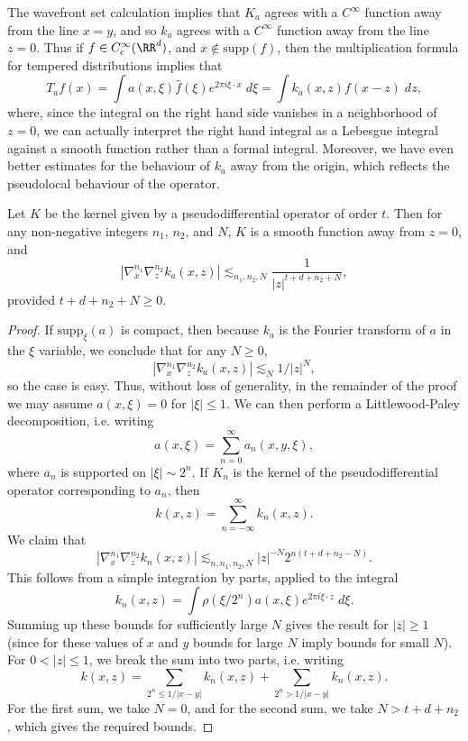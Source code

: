 The wavefront set calculation implies that $K_a$ agrees with a $C^\infty$ function away from the line $x = y$, and so $k_a$ agrees with a $C^\infty$ function away from the line $z = 0$. Thus if $f \in C_c^\infty(\RR^d)$, and $x \not \in \text{supp}(f)$, then the multiplication formula for tempered distributions implies that
%
\[ T_af(x) = \int a(x,\xi) \widehat{f}(\xi) e^{2 \pi i \xi \cdot x}\; d\xi = \int k_a(x,z) f(x-z)\; dz, \]
%
where, since the integral on the right hand side vanishes in a neighborhood of $z = 0$, we can actually interpret the right hand integral as a Lebesgue integral against a smooth function rather than a formal integral. Moreover, we have even better estimates for the behaviour of $k_a$ away from the origin, which reflects the pseudolocal behaviour of the operator.

\begin{theorem}
    Let $K$ be the kernel given by a pseudodifferential operator of order $t$. Then for any non-negative integers $n_1$, $n_2$, and $N$, $K$ is a smooth function away from $z = 0$, and
    \[ |\nabla^{n_1}_x \nabla^{n_2}_z k_a(x,z)| \lesssim_{n_1,n_2,N} \frac{1}{|z|^{t + d + n_2 + N}}, \]
    provided $t + d + n_2 + N \geq 0$.
\end{theorem}
\begin{proof}
    If $\text{supp}_\xi(a)$ is compact, then because $k_a$ is the Fourier transform of $a$ in the $\xi$ variable, we conclude that for any $N \geq 0$,
    \[ |\nabla^{n_1}_x \nabla^{n_2}_z k_a(x,z)| \lesssim_N 1 / |z|^N, \]
    so the case is easy. Thus, without loss of generality, in the remainder of the proof we may assume $a(x,\xi) = 0$ for $|\xi| \leq 1$. We can then perform a Littlewood-Paley decomposition, i.e. writing
    \[ a(x,\xi) = \sum_{n = 0}^\infty a_n(x,y,\xi), \]
    where $a_n$ is supported on $|\xi| \sim 2^n$. If $K_n$ is the kernel of the pseudodifferential operator corresponding to $a_n$, then
    \[ k(x,z) = \sum_{n = -\infty}^\infty k_n(x,z). \]
    We claim that
    \[ |\nabla^{n_1}_x \nabla^{n_2}_z k_n(x,z)| \lesssim_{n,n_1,n_2,N} |z|^{-N} 2^{n(t + d + n_2 - N)}. \]
    This follows from a simple integration by parts, applied to the integral
    \[ k_n(x,z) = \int \rho(\xi / 2^n) a(x,\xi) e^{2 \pi i \xi \cdot z}\; d\xi. \]
    Summing up these bounds for sufficiently large $N$ gives the result for $|z| \geq 1$ (since for these values of $x$ and $y$ bounds for large $N$ imply bounds for small $N$). For $0 < |z| \leq 1$, we break the sum into two parts, i.e. writing
    \[ k(x,z) = \sum_{2^n \leq 1/|x-y|} k_n(x,z) + \sum_{2^n > 1/|x-y|} k_n(x,z). \]
    For the first sum, we take $N = 0$, and for the second sum, we take $N > t + d + n_2$, which gives the required bounds.
\end{proof}

